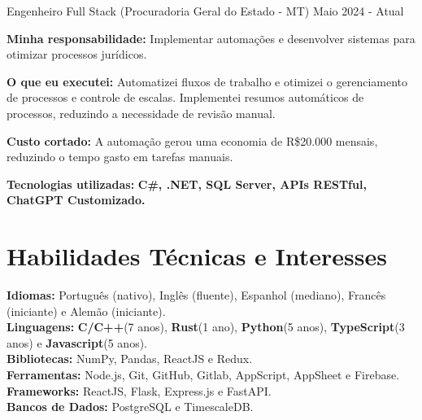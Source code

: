 \vspace{-2mm}

\resumeSubheading
{ Engenheiro Full Stack \textmd{(Procuradoria Geral do Estado - MT)}}{}
{}{Maio 2024 - Atual}
\vspace{-2.0mm}
\resumeItemListStart
\item \textbf{Minha responsabilidade:} Implementar automações e desenvolver sistemas para otimizar processos jurídicos.
\item \textbf{O que eu executei:} Automatizei fluxos de trabalho e otimizei o gerenciamento de processos e controle de escalas. Implementei resumos automáticos de processos, reduzindo a necessidade de revisão manual.
\item \textbf{Custo cortado:} A automação gerou uma economia de R\$20.000 mensais, reduzindo o tempo gasto em tarefas manuais.
\item \textbf{Tecnologias utilizadas:} \textbf{C\#, .NET, SQL Server, APIs RESTful, ChatGPT Customizado.}
\resumeItemListEnd


\vspace{-5.5mm}
\resumeSubHeadingListEnd

\section{\textbf{Habilidades Técnicas e Interesses}}
\begin{itemize}[leftmargin=0.05in, label={}]
    \small{\item{
          \textbf{Idiomas:}{ Português (nativo), Inglês (fluente), Espanhol (mediano), Francês (iniciante) e Alemão (iniciante).} \\
          \textbf{Linguagens:}{ \textbf{C/C++}(7 anos), \textbf{Rust}(1 ano), \textbf{Python}(5 anos), \textbf{TypeScript}(3 anos) e \textbf{Javascript}(5 anos). } \\
          \textbf{Bibliotecas:}{ NumPy, Pandas, ReactJS e Redux. }\\
          \textbf{Ferramentas:}{ Node.js, Git, GitHub,  Gitlab, AppScript, AppSheet e Firebase.} \\
          \textbf{Frameworks:}{ ReactJS, Flask, Express.js e FastAPI. } \\
          \textbf{Bancos de Dados:}{ PostgreSQL e TimescaleDB. } \\
          }}
\end{itemize}


